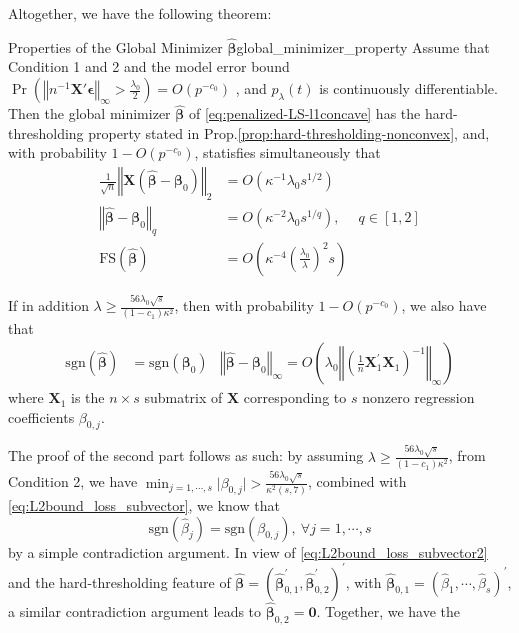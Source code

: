 \documentclass[twoside]{article}
\begin{document}
Altogether, we have the following theorem:
\begin{theorem}{Properties of the Global Minimizer $\hat{\boldsymbol{\beta}}$}{global_minimizer_property}
    Assume that Condition 1 and 2 and the model error bound $\Pr \left( \left\Vert n^{-1}\mathbf{X}'\boldsymbol{\epsilon}  \right\Vert _{\infty} >\frac{\lambda_0}{2} \right) = O\left(p^{-c_0}\right)$ , and $p_{\lambda}(t)$ is continuously differentiable. Then the global minimizer $\hat{\boldsymbol{\beta}}$ of \ref{eq:penalized-LS-l1concave} has the hard-thresholding property stated in Prop.\ref{prop:hard-thresholding-nonconvex}, and, with probability $1-O(p^{-c_0})$, statisfies simultaneously that
    \begin{align}
        \frac{1}{\sqrt{n}}\left\Vert \mathbf{X}\left( \hat{\boldsymbol{\beta}} -\boldsymbol{\beta}_0 \right) \right\Vert _2 &= O(\kappa^{-1}\lambda_0 s^{1/2}) \\
        \left\Vert \hat{\boldsymbol{\beta}}-\boldsymbol{\beta}_0 \right\Vert _q &= O(\kappa^{-2}\lambda_0 s^{1/q}), & q\in[1,2]\\
        \mathrm{FS}\left(\hat{\boldsymbol{\beta}}\right) &= O\left( \kappa^{-4} \left(\frac{\lambda_0}{\lambda}\right)^2 s \right)
    \end{align}

    If in addition $\lambda \geq \frac{56\lambda_0\sqrt{s}}{(1-c_1)\kappa^2}$, then with probability $1-O(p^{-c_0})$, we also have that 
    \begin{align*}
        \mathrm{sgn}\left(\hat{\boldsymbol{\beta}}\right) &= \mathrm{sgn}\left(\boldsymbol{\beta}_0\right) & \left\Vert \hat{\boldsymbol{\beta}}-\boldsymbol{\beta}_0 \right\Vert _{\infty} = O\left(\lambda_0\left\Vert \left(\frac{1}{n}\mathbf{X}^{\prime}_1\mathbf{X}_1 \right)^{-1} \right\Vert _{\infty}\right)
    \end{align*}
    where $\mathbf{X}_1$ is the $n\times s$ submatrix of $\mathbf{X}$ corresponding to $s$ nonzero regression coefficients $\beta_{0,j}$.
\end{theorem}
The proof of the second part follows as such: by assuming $\lambda \geq \frac{56\lambda_0\sqrt{s}}{(1-c_1)\kappa^2}$, from Condition 2, we have $\min_{j=1,\cdots,s}\lvert \beta_{0,j}\rvert > \frac{56\lambda_0\sqrt{s}}{\kappa^2(s,7)}$, combined with \ref{eq:L2bound_loss_subvector}, we know that
$$
\mathrm{sgn}\left( \hat{\beta}_j \right) = \mathrm{sgn}\left(\beta_{0,j}\right),\ \forall j=1,\cdots, s
$$
by a simple contradiction argument. In view of \ref{eq:L2bound_loss_subvector2} and the hard-thresholding feature of $\hat{\boldsymbol{\beta}} = \left( \hat{\boldsymbol{\beta}}_{0,1}^{\prime},\hat{\boldsymbol{\beta}}_{0,2}^{\prime} \right)^{\prime}$, with $\hat{\boldsymbol{\beta}}_{0,1} = \left(\hat{\beta}_1,\cdots,\hat{\beta}_s\right)^{\prime}$, a similar contradiction argument leads to $\hat{\boldsymbol{\beta}}_{0,2}=\mathbf{0}$. Together, we have the 
\end{document}
